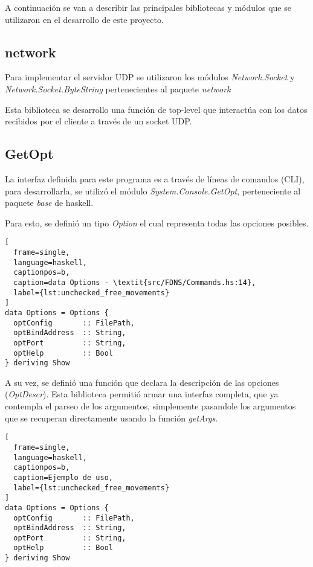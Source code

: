 \documentclass[6pt]{article}
\begin{document}
A continuación se van a describir las principales bibliotecas y módulos que se
utilizaron en el desarrollo de este proyecto.

\subsection{network \cite{package-network-socket}}

Para implementar el servidor UDP se utilizaron los módulos \textit{Network.Socket}
y \textit{Network.Socket.ByteString} pertenecientes al paquete \textit{network}

Esta biblioteca se desarrollo una función de top-level que interactúa con
los datos recibidos por el cliente a través de un socket UDP.

\subsection{GetOpt \cite{package-get-opt}}

La interfaz definida para este programa es a través de líneas
de comandos (CLI), para desarrollarla, se utilizó el módulo
\textit{System.Console.GetOpt}, perteneciente al paquete
\textit{base} de haskell.

Para esto, se definió un tipo \textit{Option} el cual representa todas
las opciones posibles.

\begin{lstlisting}[
  frame=single,
  language=haskell,
  captionpos=b,
  caption=data Options - \textit{src/FDNS/Commands.hs:14},
  label={lst:unchecked_free_movements}
]
data Options = Options {
  optConfig       :: FilePath,
  optBindAddress  :: String,
  optPort         :: String,
  optHelp         :: Bool
} deriving Show
\end{lstlisting}

A su vez, se definió una función que declara la descripción de las
opciones (\textit{OptDescr}). Esta biblioteca permitió armar una interfaz
completa, que ya contempla el parseo de los argumentos, simplemente
pasandole los argumentos que se recuperan directamente usando la función
\textit{getArgs}.

\begin{lstlisting}[
  frame=single,
  language=haskell,
  captionpos=b,
  caption=Ejemplo de uso,
  label={lst:unchecked_free_movements}
]
data Options = Options {
  optConfig       :: FilePath,
  optBindAddress  :: String,
  optPort         :: String,
  optHelp         :: Bool
} deriving Show
\end{lstlisting}
\end{document}
